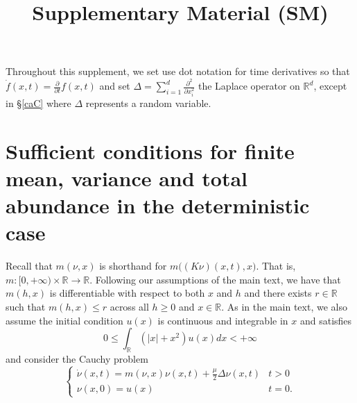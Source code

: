 \documentclass[]{article}
\title{Supplementary Material (SM)}
\author{}
\date{}
\begin{document}
\maketitle

Throughout this supplement, we set use dot notation for time derivatives
so that \(\dot f(x,t)=\frac{\partial }{\partial t}f(x,t)\) and set
\(\Delta=\sum_{i=1}^d\frac{\partial^2}{\partial x_i^2}\) the Laplace
operator on \(\mathbb{R}^d\), except in \S\ref{caC} where \(\Delta\)
represents a random variable.

\hypertarget{sufficient-conditions-for-finite-mean-variance-and-total-abundance-in-the-deterministic-case}{%
\section{\texorpdfstring{Sufficient conditions for finite mean, variance
and total abundance in the deterministic case
\label{finite}}{Sufficient conditions for finite mean, variance and total abundance in the deterministic case }}\label{sufficient-conditions-for-finite-mean-variance-and-total-abundance-in-the-deterministic-case}}

Recall that \(m(\nu,x)\) is shorthand for \(m\big((K\nu)(x,t),x\big)\).
That is, \(m:[0,+\infty)\times\mathbb{R}\to\mathbb{R}\). Following our
assumptions of the main text, we have that \(m(h,x)\) is differentiable
with respect to both \(x\) and \(h\) and there exists \(r\in\mathbb{R}\)
such that \(m(h,x)\leq r\) across all \(h\geq0\) and \(x\in\mathbb{R}\).
As in the main text, we also assume the initial condition \(u(x)\) is
continuous and integrable in \(x\) and satisfies \begin{equation}
0\leq\int_{\mathbb{R}}(|x|+x^2)u(x)dx<+\infty
\end{equation} and consider the Cauchy problem
\begin{equation}\label{PDE_SM}
\left\{\begin{matrix}
\dot\nu(x,t)=m(\nu,x)\nu(x,t)+\frac{\mu}{2}\Delta\nu(x,t) & t>0\\
\nu(x,0)=u(x) & t=0.
\end{matrix}\right.
\end{equation}
\end{document}
